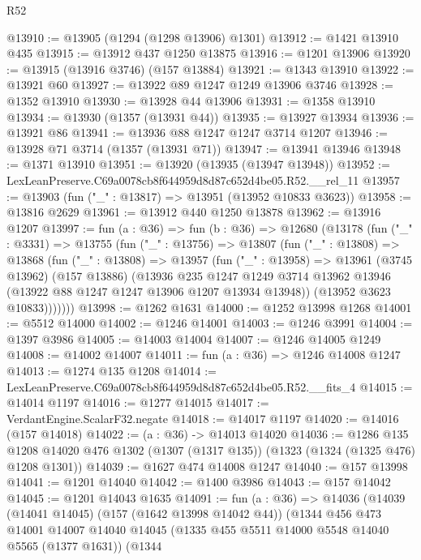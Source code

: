 \begin{lexlean}{R52}
\begin{coremodule}
@13910 := @13905 (@1294 (@1298 @13906) @1301)
@13912 := @1421 @13910 @435
@13915 := @13912 @437 @1250 @13875
@13916 := @1201 @13906
@13920 := @13915 (@13916 @3746) (@157 @13884)
@13921 := @1343 @13910
@13922 := @13921 @60
@13927 := @13922 @89 @1247 @1249 @13906 @3746
@13928 := @1352 @13910
@13930 := @13928 @44 @13906
@13931 := @1358 @13910
@13934 := @13930 (@1357 (@13931 @44))
@13935 := @13927 @13934
@13936 := @13921 @86
@13941 := @13936 @88 @1247 @1247 @3714 @1207
@13946 := @13928 @71 @3714 (@1357 (@13931 @71))
@13947 := @13941 @13946
@13948 := @1371 @13910
@13951 := @13920 (@13935 (@13947 @13948))
@13952 := LexLeanPreserve.C69a0078cb8f644959d8d87c652d4be05.R52.__rel_11
@13957 := @13903 (fun ("_" : @13817) => @13951 (@13952 @10833 @3623))
@13958 := @13816 @2629
@13961 := @13912 @440 @1250 @13878
@13962 := @13916 @1207
@13997 := fun (a : @36) =>
  fun (b : @36) =>
  @12680
    (@13178
      (fun ("_" : @3331) =>
      @13755
        (fun ("_" : @13756) =>
        @13807
          (fun ("_" : @13808) =>
          @13868
            (fun ("_" : @13808) =>
            @13957
              (fun ("_" : @13958) =>
              @13961
                (@3745 @13962)
                (@157 @13886)
                (@13936
                  @235
                  @1247
                  @1249
                  @3714
                  @13962
                  @13946
                  (@13922 @88 @1247 @1247 @13906 @1207 @13934 @13948))
                (@13952 @3623 @10833)))))))
@13998 := @1262 @1631
@14000 := @1252 @13998 @1268
@14001 := @5512 @14000
@14002 := @1246 @14001
@14003 := @1246 @3991
@14004 := @1397 @3986
@14005 := @14003 @14004
@14007 := @1246 @14005 @1249
@14008 := @14002 @14007
@14011 := fun (a : @36) => @1246 @14008 @1247
@14013 := @1274 @135 @1208
@14014 := LexLeanPreserve.C69a0078cb8f644959d8d87c652d4be05.R52.__fits_4
@14015 := @14014 @1197
@14016 := @1277 @14015
@14017 := VerdantEngine.ScalarF32.negate
@14018 := @14017 @1197
@14020 := @14016 (@157 @14018)
@14022 := (a : @36) -> @14013 @14020
@14036 := @1286
    @135
    @1208
    @14020
    @476
    @1302
    (@1307 (@1317 @135))
    (@1323 (@1324 (@1325 @476) @1208 @1301))
@14039 := @1627 @474 @14008 @1247
@14040 := @157 @13998
@14041 := @1201 @14040
@14042 := @1400 @3986
@14043 := @157 @14042
@14045 := @1201 @14043 @1635
@14091 := fun (a : @36) =>
  @14036
    (@14039
      (@14041 @14045)
      (@157 (@1642 @13998 @14042 @44))
      (@1344
        @456
        @473
        @14001
        @14007
        @14040
        @14045
        (@1335 @455 @5511 @14000 @5548 @14040 @5565 (@1377 @1631))
        (@1344

\end{coremodule}
\end{lexlean}
